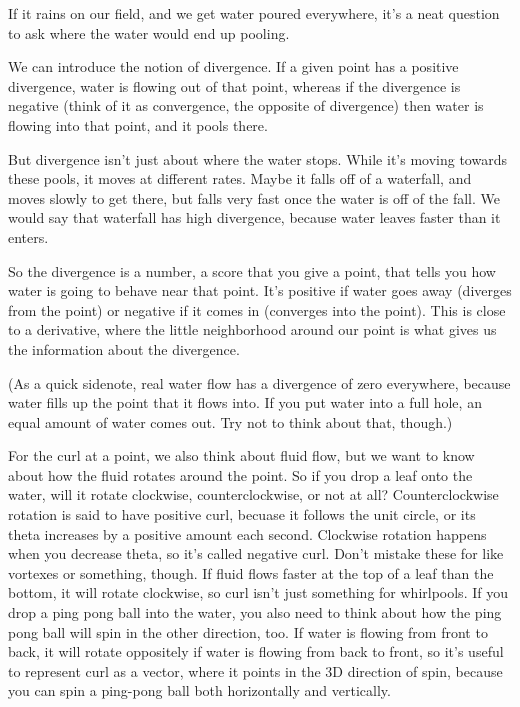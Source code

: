 \documentclass[12pt, letterpaper]{article}
\begin{document}
If it rains on our field, and we get water poured everywhere, it's a neat question to ask where the water would end up pooling.

We can introduce the notion of divergence.
If a given point has a positive divergence, water is flowing out of that point, whereas if the divergence is negative (think of it as convergence, the opposite of divergence)
then water is flowing into that point, and it pools there.

But divergence isn't just about where the water stops.
While it's moving towards these pools, it moves at different rates.
Maybe it falls off of a waterfall, and moves slowly to get there, but falls very fast once the water is off of the fall.
We would say that waterfall has high divergence, because water leaves faster than it enters.

So the divergence is a number, a score that you give a point, that tells you how water is going to behave near that point.
It's positive if water goes away (diverges from the point) or negative if it comes in (converges into the point).
This is close to a derivative, where the little neighborhood around our point is what gives us the information about the divergence.

(As a quick sidenote, real water flow has a divergence of zero everywhere, because water fills up the point that it flows into.
If you put water into a full hole, an equal amount of water comes out.
Try not to think about that, though.)

For the curl at a point, we also think about fluid flow, but we want to know about how the fluid rotates around the point.
So if you drop a leaf onto the water, will it rotate clockwise, counterclockwise, or not at all?
Counterclockwise rotation is said to have positive curl, becuase it follows the unit circle, or its theta increases by a positive amount each second.
Clockwise rotation happens when you decrease theta, so it's called negative curl.
Don't mistake these for like vortexes or something, though.
If fluid flows faster at the top of a leaf than the bottom, it will rotate clockwise, so curl isn't just something for whirlpools.
If you drop a ping pong ball into the water, you also need to think about how the ping pong ball will spin in the other direction, too.
If water is flowing from front to back, it will rotate oppositely if water is flowing from back to front, so it's useful to represent curl as a vector,
where it points in the 3D direction of spin, because you can spin a ping-pong ball both horizontally and vertically.
\end{document}
